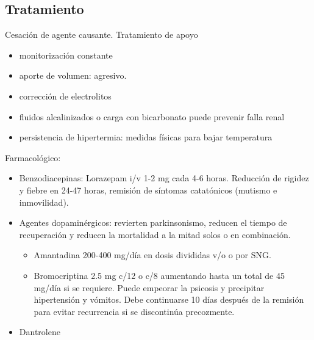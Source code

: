 \subsection*{Tratamiento}
Cesación de agente causante.
Tratamiento de apoyo
\begin{itemize}
	\item monitorización constante
	\item aporte de volumen: agresivo.
	\item corrección de electrolitos
	\item fluidos alcalinizados o carga con bicarbonato puede prevenir falla renal
	\item persistencia de hipertermia: medidas físicas para bajar temperatura
\end{itemize}
Farmacológico:
\begin{itemize}
	\item Benzodiacepinas: Lorazepam i/v 1-2 mg cada 4-6 horas. Reducción de rigidez y fiebre en 24-47 horas, remisión de síntomas catatónicos (mutismo e inmovilidad).
	\item Agentes dopaminérgicos: revierten parkinsonismo, reducen el tiempo de recuperación y reducen la mortalidad a la mitad solos o en combinación.
	\begin{itemize}
		\item Amantadina 200-400 mg/día en dosis divididas v/o o por SNG.
		\item Bromocriptina 2.5 mg c/12 o c/8 aumentando hasta un total de 45 mg/día si se requiere. Puede empeorar la psicosis y precipitar hipertensión y vómitos. Debe continuarse 10 días después de la remisión para evitar recurrencia si se discontinúa precozmente.
	\end{itemize}
	\item Dantrolene
\end{itemize}